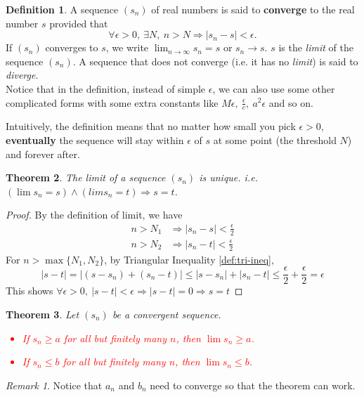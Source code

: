 \documentclass[12pt, lettersize]{book}
\theoremstyle{plain}
\newtheorem{thm}{Theorem}[section]
\theoremstyle{definition}
\newtheorem{dfn}[thm]{Definition}
\theoremstyle{remark}
\newtheorem*{rem}{Remark}
\begin{document}
		\begin{dfn}\label{def:limit}
		A sequence $(s_n)$ of real numbers is said to \textbf{converge} to the real number \emph{$s$} provided that
		\begin{displaymath}
			\forall \epsilon > 0,\ \exists N,\ n > N \Rightarrow |s_n-s| < \epsilon.
		\end{displaymath}
		If $(s_n)$ converges to $s$, we write $\lim_{n\rightarrow \infty}s_n=s$ or $s_n\rightarrow s$. $s$ is the \emph{limit} of the sequence $(s_n)$.
		A sequence that does not converge (i.e. it has no \emph{limit}) is said to \emph{diverge}.\\
		Notice that in the definition, instead of simple $\epsilon$, we can also use some other complicated forms with some extra constants like $M\epsilon,\ \frac{\epsilon}{c},\ a^2\epsilon$ and so on.
		\end{dfn}
	
		Intuitively, the definition means that no matter how small you pick $\epsilon>0$, \textbf{eventually} the sequence will stay within $\epsilon$ of $s$ at some point (the threshold $N$) and forever after.
	
		\begin{thm}
		The limit of a sequence $(s_n)$ is unique. i.e. $(\lim s_n=s) \land (lim s_n=t) \Rightarrow s=t$.
		\end{thm}
		\begin{proof}
		By the definition of limit, we have
		\begin{align*}
			n > N_1 &\Rightarrow |s_n-s| < \frac{\epsilon}{2}\\
			n > N_2 &\Rightarrow |s_n-t| < \frac{\epsilon}{2}
		\end{align*}
		For $n>\max\{N_1,N_2\}$, by Triangular Inequality \ref{def:tri-ineq},
		\begin{displaymath}
			|s-t|=|(s-s_n)+(s_n-t)|\leq |s-s_n|+|s_n-t|\leq \frac{\epsilon}{2}+\frac{\epsilon}{2}=\epsilon
		\end{displaymath}
		This shows $\forall \epsilon>0,\ |s-t|<\epsilon\Rightarrow |s-t|=0\Rightarrow s=t$
		\end{proof}
		\newpage
		
		\begin{thm}
		Let $(s_n)$ be a convergent sequence.\textcolor{red}{
		\begin{itemize}
			\item If $s_n\geq a$ for all but finitely many $n$, then $\lim s_n\geq a$.
			\item If $s_n\leq b$ for all but finitely many $n$, then $\lim s_n\leq b$.
		\end{itemize}}
		\end{thm}
		\begin{rem}
			Notice that $a_n$ and $b_n$ need to converge so that the theorem can work.
		\end{rem}
		
\end{document}
